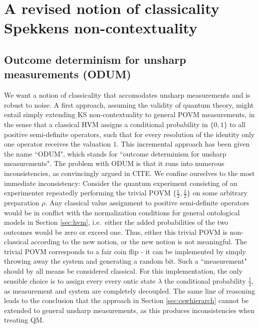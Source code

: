 \chapter[A revised notion of classicality \\ Spekkens non-contextuality]{A revised notion of classicality \\ \huge{Spekkens non-contextuality}}
\label{sec:spekkcont}
\section{Outcome determinism for unsharp measurements (ODUM)}
\label{sec:odum}
We want a notion of classicality that accomodates unsharp measurements and is robust to noise. A first approach, assuming the validity of quantum theory, might entail simply extending KS non-contextuality to general POVM measurements, in the sense that a classical HVM assigns a conditional probability in $\{0,1\}$ to all positive semi-definite operators, such that for every resolution of the identity only one operator receives the valuation $1$. This incremental approach has been given the name ``ODUM", which stands for ``outcome determinism for unsharp measurements". The problem with ODUM is that it runs into numerous inconsistencies, as convincingly argued in CITE. We confine ourselves to the most immediate inconsistency: Consider the quantum experiment consisting of an experimenter repeatedly performing the trivial POVM $\{\frac{\mathbb{1}}{2},\frac{\mathbb{1}}{2}\}$ on some arbitrary preparation $\rho$. Any classical value assignment to positive semi-definite operators would be in conflict with the normalization conditions for general ontological models in Section \ref{sec:hvm}, i.e.\ either the added probabilities of the two outcomes would be zero or exceed one. Thus, either this trivial POVM is non-classical according to the new notion, or the new notion is not meaningful. The trivial POVM corresponds to a fair coin flip - it can be implemented by simply throwing away the system and generating a random bit. Such a ``measurement" should by all means be considered classical. For this implementation, the only sensible choice is to assign every every ontic state $\lambda$ the conditional probability $\frac{1}{2}$, as measurement and system are completely decoupled. The same line of reasoning leads to the conclusion that the approach in Section \ref{sec:cswhierarch} cannot be extended to general unsharp measurements, as this produces inconsistencies when treating QM.

